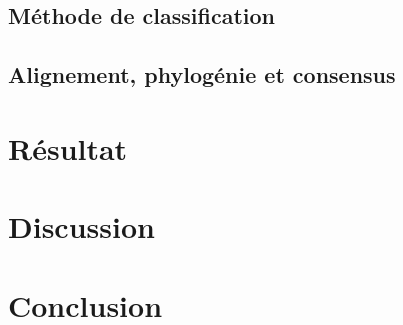 \documentclass[12pt,a4paper]{article}
\begin{document}
\subsection{Méthode de classification}
\subsection{Alignement, phylogénie et consensus}
\section{Résultat}
\section{Discussion}
\section{Conclusion}


%
% 
%
%
%
% 
% 
\end{document}

